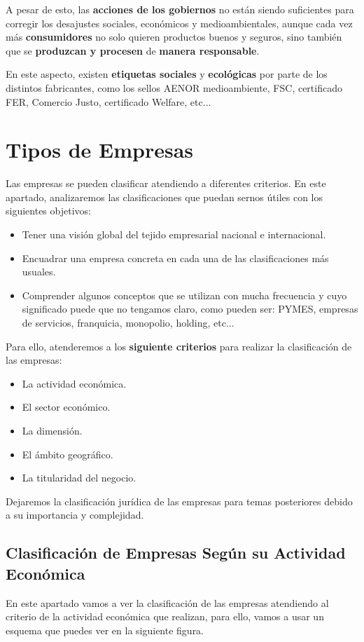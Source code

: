 A pesar de esto, las \textbf{acciones de los gobiernos} no están siendo suficientes para corregir los desajustes sociales, económicos y medioambientales, aunque cada vez más \textbf{consumidores} no solo quieren productos buenos y seguros, sino también que se \textbf{produzcan y procesen} de \textbf{manera responsable}.

En este aspecto, existen \textbf{etiquetas sociales} y \textbf{ecológicas} por parte de los distintos fabricantes, como los sellos AENOR medioambiente, FSC, certificado FER, Comercio Justo, certificado Welfare, etc...

\section{Tipos de Empresas}
Las empresas se pueden clasificar atendiendo a diferentes criterios. En este apartado, analizaremos las clasificaciones que puedan sernos útiles con los siguientes objetivos:

\begin{itemize}
    \item Tener una visión global del tejido empresarial nacional e internacional.
    \item Encuadrar una empresa concreta en cada una de las clasificaciones más usuales.
    \item Comprender algunos conceptos que se utilizan con mucha frecuencia y cuyo significado puede que no tengamos claro, como pueden ser: PYMES, empresas de servicios, franquicia, monopolio, holding, etc...
\end{itemize}

Para ello, atenderemos a los \textbf{siguiente criterios} para realizar la clasificación de las empresas:

\begin{itemize}
    \item La actividad económica.
    \item El sector económico.
    \item La dimensión.
    \item El ámbito geográfico.
    \item La titularidad del negocio.
\end{itemize}

Dejaremos la clasificación jurídica de las empresas para temas posteriores debido a su importancia y complejidad.

\subsection{Clasificación de Empresas Según su Actividad Económica}
En este apartado vamos a ver la clasificación de las empresas atendiendo al criterio de la actividad económica que realizan, para ello, vamos a usar un esquema que puedes ver en la siguiente figura.

